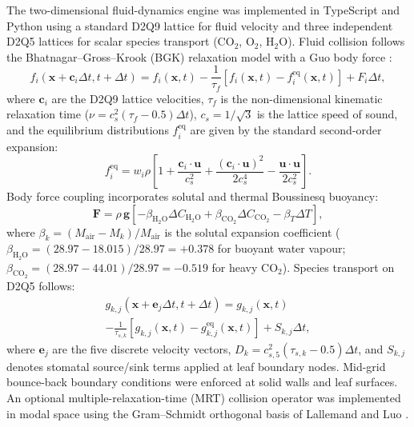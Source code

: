 \documentclass[10pt,twocolumn,a4paper]{article}
\begin{document}
The two-dimensional fluid-dynamics engine was implemented in TypeScript and Python using a standard D2Q9 lattice for fluid velocity and three independent D2Q5 lattices for scalar species transport ($\mathrm{CO_2}$, $\mathrm{O_2}$, $\mathrm{H_2O}$). Fluid collision follows the Bhatnagar--Gross--Krook (BGK) relaxation model with a Guo body force \citep{guo2002}:
\begin{equation}
f_i(\mathbf{x} + \mathbf{c}_i\Delta t, t + \Delta t) = f_i(\mathbf{x}, t) - \frac{1}{\tau_f}\left[f_i(\mathbf{x}, t) - f_i^{\text{eq}}(\mathbf{x}, t)\right] + F_i\Delta t ,
\end{equation}
where $\mathbf{c}_i$ are the D2Q9 lattice velocities, $\tau_f$ is the non-dimensional kinematic relaxation time ($\nu = c_s^2(\tau_f - 0.5)\Delta t$), $c_s = 1/\sqrt{3}$ is the lattice speed of sound, and the equilibrium distributions $f_i^{\text{eq}}$ are given by the standard second-order expansion:
\begin{equation}
f_i^{\text{eq}} = w_i\rho\left[1 + \frac{\mathbf{c}_i\cdot\mathbf{u}}{c_s^2} + \frac{(\mathbf{c}_i\cdot\mathbf{u})^2}{2c_s^4} - \frac{\mathbf{u}\cdot\mathbf{u}}{2c_s^2}\right] .
\end{equation}
Body force coupling incorporates solutal and thermal Boussinesq buoyancy:
\begin{equation}
\mathbf{F} = \rho\,\mathbf{g}\left[-\beta_{\mathrm{H_2O}}\Delta C_{\mathrm{H_2O}} + \beta_{\mathrm{CO_2}}\Delta C_{\mathrm{CO_2}} - \beta_T\Delta T\right] ,
\end{equation}
where $\beta_k = (M_{\text{air}} - M_k)/M_{\text{air}}$ is the solutal expansion coefficient ($\beta_{\mathrm{H_2O}} = (28.97 - 18.015)/28.97 = +0.378$ for buoyant water vapour; $\beta_{\mathrm{CO_2}} = (28.97 - 44.01)/28.97 = -0.519$ for heavy $\mathrm{CO_2}$). Species transport on D2Q5 follows:
\begin{multline}
g_{k,j}(\mathbf{x} + \mathbf{e}_j\Delta t, t + \Delta t) = g_{k,j}(\mathbf{x}, t) \\
- \frac{1}{\tau_{s,k}}\left[g_{k,j}(\mathbf{x}, t) - g_{k,j}^{\text{eq}}(\mathbf{x}, t)\right] + S_{k,j}\Delta t ,
\end{multline}
where $\mathbf{e}_j$ are the five discrete velocity vectors, $D_k = c_{s,5}^2(\tau_{s,k} - 0.5)\Delta t$, and $S_{k,j}$ denotes stomatal source/sink terms applied at leaf boundary nodes. Mid-grid bounce-back boundary conditions were enforced at solid walls and leaf surfaces. An optional multiple-relaxation-time (MRT) collision operator was implemented in modal space using the Gram--Schmidt orthogonal basis of Lallemand and Luo \citep{lallemand2000}.
\end{document}
